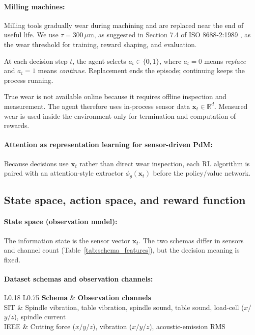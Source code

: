 \documentclass[sn-basic]{sn-jnl}%
\begin{document}
\paragraph{Milling machines:}
Milling tools gradually wear during machining and are replaced near the end of useful life. We use $\tau = 300\,\mu\mathrm{m}$, as suggested in Section 7.4 of ISO 8688-2:1989 \citep{ISO8688-2-1989}, as the wear threshold for training, reward shaping, and evaluation.

At each decision step $t$, the agent selects $a_t\in\{0,1\}$, where $a_t=0$ means \emph{replace} and $a_t=1$ means \emph{continue}. Replacement ends the episode; continuing keeps the process running.

True wear is not available online because it requires offline inspection and measurement. The agent therefore uses in-process sensor data $\mathbf{x}_t\in\mathbb{R}^d$. Measured wear is used inside the environment only for termination and computation of rewards.

\paragraph{Attention as representation learning for sensor-driven PdM:}
Because decisions use $\mathbf{x}_t$ rather than direct wear inspection, each RL algorithm is paired with an attention-style extractor $\phi_\theta(\mathbf{x}_t)$ before the policy/value network.

\subsection{State space, action space, and reward function}
\label{sec:mdp_components}

\paragraph{State space (observation model):}
The information state is the sensor vector $\mathbf{x}_t$. The two schemas differ in sensors and channel count (Table~\ref{tab:schema_features}), but the decision meaning is fixed.

\paragraph{Dataset schemas and observation channels:}
\begin{table}[htbp]
\centering
\caption{Sensor channels used as observations by the RL environment}
\label{tab:schema_features}
	\begin{tabular}{L{0.18\linewidth} L{0.75\linewidth}}
	\toprule
	\textbf{Schema} & \textbf{Observation channels}\\
	\midrule
	SIT & Spindle vibration, table vibration, spindle sound, table sound, load-cell ($x$/$y$/$z$), spindle current\\
	IEEE & Cutting force ($x$/$y$/$z$), vibration ($x$/$y$/$z$), acoustic-emission RMS\\
	\bottomrule
	\end{tabular}
\end{table}
\end{document}

